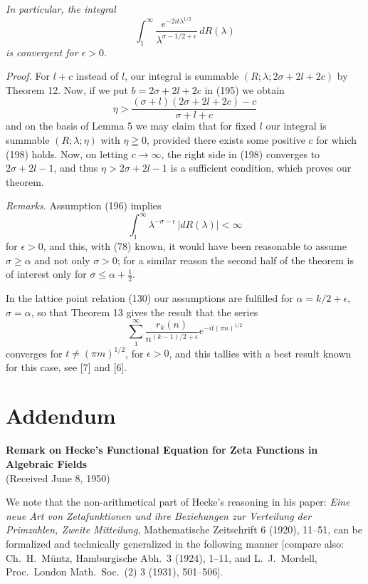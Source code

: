 \documentclass[12pt]{article}
\begin{document}
\emph{In particular, the integral}
\begin{equation}
\int_1^{\infty} \frac{e^{-2it\lambda^{1/2}}}{\lambda^{\sigma-1/2+\epsilon}} \, dR(\lambda)
\tag{197}
\end{equation}
\emph{is convergent for \(\epsilon > 0\).}

\medskip

\noindent\emph{Proof.} For \(l + c\) instead of \(l\), our integral is summable \((R; \lambda; 2\sigma + 2l + 2c)\) by Theorem 12. Now, if we put \(b = 2\sigma + 2l + 2c\) in (195) we obtain
\begin{equation}
\eta > \frac{(\sigma + l)(2\sigma + 2l + 2c) - c}{\sigma + l + c}
\tag{198}
\end{equation}
and on the basis of Lemma 5 we may claim that for fixed \(l\) our integral is summable \((R; \lambda; \eta)\) with \(\eta \geqq 0\), provided there exists some positive \(c\) for which (198) holds. Now, on letting \(c \to \infty\), the right side in (198) converges to \(2\sigma + 2l - 1\), and thus \(\eta > 2\sigma + 2l - 1\) is a sufficient condition, which proves our theorem.

\medskip

\noindent\emph{Remarks.} Assumption (196) implies
\[
\int_1^{\infty} \lambda^{-\sigma-\epsilon} \, |dR(\lambda)| < \infty
\]
for \(\epsilon > 0\), and this, with (78) known, it would have been reasonable to assume \(\sigma \ge \alpha\) and not only \(\sigma > 0\); for a similar reason the second half of the theorem is of interest only for \(\sigma \le \alpha + \tfrac{1}{2}\).

In the lattice point relation (130) our assumptions are fulfilled for \(\alpha = k/2 + \epsilon\), \(\sigma = \alpha\), so that Theorem 13 gives the result that the series
\[
\sum_1^{\infty} \frac{r_k(n)}{n^{(k-1)/2 + \epsilon}} e^{-it(\pi n)^{1/2}}
\]
converges for \(t \ne (\pi m)^{1/2}\), for \(\epsilon > 0\), and this tallies with a best result known for this case, see [7] and [6].

\section*{Addendum}

\noindent\textbf{Remark on Hecke's Functional Equation for Zeta Functions in Algebraic Fields}\\
(Received June 8, 1950)

We note that the non-arithmetical part of Hecke's reasoning in his paper: \emph{Eine neue Art von Zetafunktionen und ihre Beziehungen zur Verteilung der Primzahlen, Zweite Mitteilung}, Mathematische Zeitschrift 6 (1920), 11–51, can be formalized and technically generalized in the following manner [compare also: Ch.~H.~Müntz, Hamburgische Abh.~3 (1924), 1–11, and L.~J.~Mordell, Proc.~London Math.~Soc.~(2) 3 (1931), 501–506].
\end{document}
